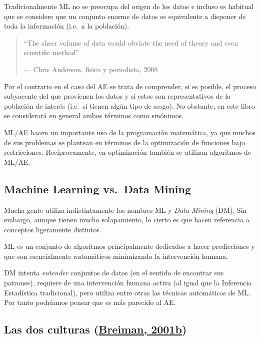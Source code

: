 \documentclass[
  spanish,
]{book}
\theoremstyle{break}
\theoremstyle{definition}
\theoremstyle{definition}
\theoremstyle{definition}
\theoremstyle{definition}
\theoremstyle{remark}
\begin{document}
Tradicionalmente ML no se preocupa del origen de los datos e incluso es habitual que se considere que un conjunto enorme de datos es equivalente a disponer de toda la información (i.e.~a la población).

\begin{quote}
``The sheer volume of data would obviate the need of theory and even
scientific method''

--- Chris Anderson, físico y periodista, 2008
\end{quote}

Por el contrario en el caso del AE se trata de comprender, si es posible, el proceso subyacente del que provienen los datos y si estos son representativos de la población de interés (i.e.~si tienen algún tipo de sesgo).
No obstante, en este libro se considerará en general ambos términos como sinónimos.

ML/AE hacen un importante uso de la programación matemática, ya que muchos de sus problemas se plantean en términos de la optimización de funciones bajo restricciones.
Recíprocamente, en optimización también se utilizan algoritmos de ML/AE.

\hypertarget{machine-learning-vs.-data-mining}{%
\subsection{Machine Learning vs.~Data Mining}\label{machine-learning-vs.-data-mining}}

Mucha gente utiliza indistintamente los nombres ML y \emph{Data Mining} (DM).
Sin embargo, aunque tienen mucho solapamiento, lo cierto es que hacen referencia a conceptos ligeramente distintos.

ML es un conjunto de algoritmos principalmente dedicados a hacer predicciones y que son esencialmente automáticos minimizando la intervención humana.

DM intenta \emph{entender} conjuntos de datos (en el sentido de encontrar sus patrones), requiere de una intervención humana activa (al igual que la Inferencia Estadística tradicional), pero utiliza entre otras las técnicas automáticas de ML. Por tanto podríamos pensar que es más parecido al AE.

\hypertarget{las-dos-culturas-breiman2001statistical}{%
\subsection{\texorpdfstring{Las dos culturas (\protect\hyperlink{ref-breiman2001statistical}{Breiman, 2001b})}{Las dos culturas (Breiman, 2001b)}}\label{las-dos-culturas-breiman2001statistical}}
\end{document}
